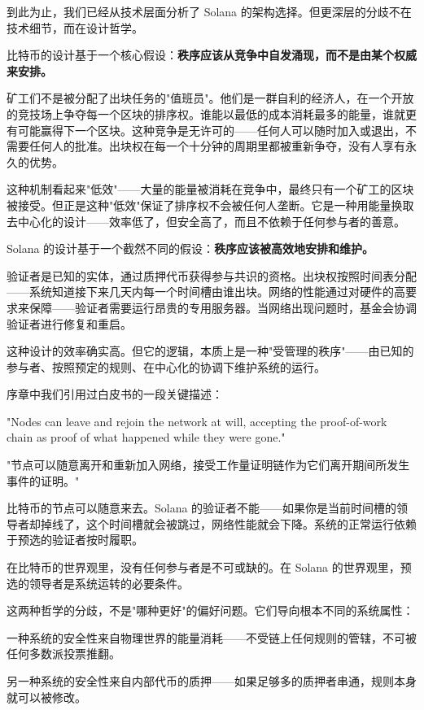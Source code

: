 \documentclass[a4paper,12pt,openany]{ctexbook}
\newenvironment{quoting}{%
  \par\vspace{0.5em}%
  \begin{list}{}{%
    \setlength{\leftmargin}{2em}%
    \setlength{\rightmargin}{2em}%
    \setlength{\parsep}{0.3em}%
    \setlength{\itemsep}{0pt}%
    \setlength{\topsep}{0pt}%
  }%
  \item\relax
}{%
  \end{list}%
  \par\vspace{0.5em}%
}
\begin{document}
到此为止，我们已经从技术层面分析了 Solana 的架构选择。但更深层的分歧不在技术细节，而在设计哲学。

比特币的设计基于一个核心假设：\textbf{秩序应该从竞争中自发涌现，而不是由某个权威来安排。}

矿工们不是被分配了出块任务的"值班员"。他们是一群自利的经济人，在一个开放的竞技场上争夺每一个区块的排序权。谁能以最低的成本消耗最多的能量，谁就更有可能赢得下一个区块。这种竞争是无许可的——任何人可以随时加入或退出，不需要任何人的批准。出块权在每一个十分钟的周期里都被重新争夺，没有人享有永久的优势。

这种机制看起来"低效"——大量的能量被消耗在竞争中，最终只有一个矿工的区块被接受。但正是这种"低效"保证了排序权不会被任何人垄断。它是一种用能量换取去中心化的设计——效率低了，但安全高了，而且不依赖于任何参与者的善意。

Solana 的设计基于一个截然不同的假设：\textbf{秩序应该被高效地安排和维护。}

验证者是已知的实体，通过质押代币获得参与共识的资格。出块权按照时间表分配——系统知道接下来几天内每一个时间槽由谁出块。网络的性能通过对硬件的高要求来保障——验证者需要运行昂贵的专用服务器。当网络出现问题时，基金会协调验证者进行修复和重启。

这种设计的效率确实高。但它的逻辑，本质上是一种"受管理的秩序"——由已知的参与者、按照预定的规则、在中心化的协调下维护系统的运行。

序章中我们引用过白皮书的一段关键描述：


\begin{quoting}
\small
"Nodes can leave and rejoin the network at will, accepting the proof-of-work chain as proof of what happened while they were gone."

"节点可以随意离开和重新加入网络，接受工作量证明链作为它们离开期间所发生事件的证明。"
\end{quoting}


比特币的节点可以随意来去。Solana 的验证者不能——如果你是当前时间槽的领导者却掉线了，这个时间槽就会被跳过，网络性能就会下降。系统的正常运行依赖于预选的验证者按时履职。

在比特币的世界观里，没有任何参与者是不可或缺的。在 Solana 的世界观里，预选的领导者是系统运转的必要条件。

这两种哲学的分歧，不是"哪种更好"的偏好问题。它们导向根本不同的系统属性：

一种系统的安全性来自物理世界的能量消耗——不受链上任何规则的管辖，不可被任何多数派投票推翻。

另一种系统的安全性来自内部代币的质押——如果足够多的质押者串通，规则本身就可以被修改。
\end{document}
